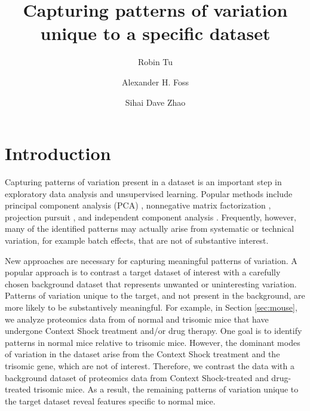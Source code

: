 \documentclass[12pt]{article}
\title{Capturing patterns of variation unique to a specific dataset}
\author[1]{Robin Tu}
\author[2]{Alexander H. Foss}
\author[1]{Sihai Dave Zhao}
\affil[1]{Department of Statistics, University of Illinois at Urbana-Champaign, Champaign, IL}
\affil[2]{Statistical Sciences, Sandia National Laboratories, Albuquerque, NM}
\begin{document}
\maketitle

\section{Introduction}

Capturing patterns of variation present in a dataset is an important step in exploratory data analysis and unsupervised learning. Popular methods include principal component analysis (PCA) \cite{pca}, nonnegative matrix factorization \cite{Lee1999}, projection pursuit \cite{pp}, and independent component analysis \cite{ica}. Frequently, however, many of the identified patterns may actually arise from systematic or technical variation, for example batch effects, that are not of substantive interest.

New approaches are necessary for capturing meaningful patterns of variation. A popular approach is to contrast a target dataset of interest with a carefully chosen background dataset that represents unwanted or uninteresting variation. Patterns of variation unique to the target, and not present in the background, are more likely to be substantively meaningful.
For example, in Section \ref{sec:mouse}, we analyze proteomics data from of normal and trisomic mice that have undergone Context Shock treatment and/or drug therapy. One goal is to identify patterns in normal mice relative to trisomic mice. However, the dominant modes of variation in the dataset arise from the Context Shock treatment and the trisomic gene, which are not of interest. Therefore, we contrast the data with a background dataset of proteomics data from Context Shock-treated and drug-treated trisomic mice. As a result, the remaining patterns of variation unique to the target dataset reveal features specific to normal mice.
\end{document}
